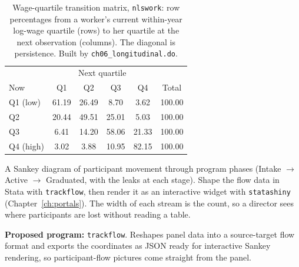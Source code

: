 \documentclass[
    a4paper,
    fontsize=10pt,
    twoside=true,
    numbers=noenddot,
]{kaobook}
\newenvironment{vizcallout}[1][Visualization to build]{%
    \begin{vizbox}[frametitle={#1}]%
}{%
    \end{vizbox}%
}
\begin{document}
\begin{table}[htbp]
\centering
\caption[Wage-quartile transition matrix]{Wage-quartile transition matrix, \texttt{nlswork}: row percentages from a worker's current within-year log-wage quartile (rows) to her quartile at the next observation (columns). The diagonal is persistence. Built by \texttt{ch06\_longitudinal.do}.}
\label{tab:transition}
{\footnotesize
\begin{tabular}{lccccc}
\hline
             & \multicolumn{4}{c}{Next quartile} &        \\
Now          & Q1     & Q2     & Q3     & Q4     & Total  \\
\hline
Q1 (low)     & 61.19  & 26.49  &  8.70  &  3.62  & 100.00 \\
Q2           & 20.44  & 49.51  & 25.01  &  5.03  & 100.00 \\
Q3           &  6.41  & 14.20  & 58.06  & 21.33  & 100.00 \\
Q4 (high)    &  3.02  &  3.88  & 10.95  & 82.15  & 100.00 \\
\hline
\end{tabular}
}
\end{table}

\begin{vizcallout}[Visualization to build: the Sankey flow]
A Sankey diagram of participant movement through program phases (Intake $\rightarrow$ Active $\rightarrow$ Graduated, with the leaks at each stage). Shape the flow data in Stata with \texttt{trackflow}, then render it as an interactive widget with \texttt{statashiny} (Chapter~\ref{ch:portals}). The width of each stream is the count, so a director sees where participants are lost without reading a table.
\end{vizcallout}

\begin{kaobox}[frametitle=Ado-file Idea: \texttt{trackflow}]
\textbf{Proposed program:} \texttt{trackflow}. Reshapes panel data into a source-target flow format and exports the coordinates as JSON ready for interactive Sankey rendering, so participant-flow pictures come straight from the panel.
\end{kaobox}
\end{document}
